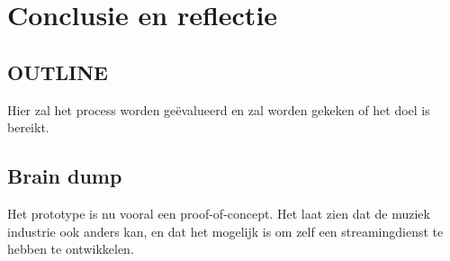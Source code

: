 \section{Conclusie en reflectie}

\subsection*{OUTLINE}
Hier zal het process worden geëvalueerd en zal worden gekeken of het doel is bereikt.


\subsection{Brain dump}
Het prototype is nu vooral een proof-of-concept. Het laat zien dat de muziek industrie ook anders kan, en dat het mogelijk is om zelf een streamingdienst te hebben te ontwikkelen.

